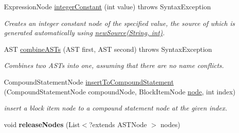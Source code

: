 \begin{DoxyCompactItemize}
Expression\+Node \hyperlink{classedu_1_1udel_1_1cis_1_1vsl_1_1civl_1_1transform_1_1common_1_1BaseWorker_a7319636f3dfa7b664614020a9644caed}{integer\+Constant} (int value)  throws Syntax\+Exception 
\begin{DoxyCompactList}\small\item\em Creates an integer constant node of the specified value, the source of which is generated automatically using \hyperlink{classedu_1_1udel_1_1cis_1_1vsl_1_1civl_1_1transform_1_1common_1_1BaseWorker_a45d64b7e09a96de3fe161198a0ad8f5a}{new\+Source(\+String, int)}. \end{DoxyCompactList}\item 
A\+S\+T \hyperlink{classedu_1_1udel_1_1cis_1_1vsl_1_1civl_1_1transform_1_1common_1_1BaseWorker_ababeeb0da2669691b3e64445cc33d348}{combine\+A\+S\+Ts} (A\+S\+T first, A\+S\+T second)  throws Syntax\+Exception 
\begin{DoxyCompactList}\small\item\em Combines two A\+S\+Ts into one, assuming that there are no name conflicts. \end{DoxyCompactList}\item 
Compound\+Statement\+Node \hyperlink{classedu_1_1udel_1_1cis_1_1vsl_1_1civl_1_1transform_1_1common_1_1BaseWorker_ae7e4963406c0589fc8219552b591a3a0}{insert\+To\+Compound\+Statement} (Compound\+Statement\+Node compound\+Node, Block\+Item\+Node \hyperlink{structnode}{node}, int index)
\begin{DoxyCompactList}\small\item\em insert a block item node to a compound statement node at the given index. \end{DoxyCompactList}\item 
\hypertarget{classedu_1_1udel_1_1cis_1_1vsl_1_1civl_1_1transform_1_1common_1_1BaseWorker_ad4a228f5e07d9d42e9356536743504a7}{}void {\bfseries release\+Nodes} (List$<$?extends A\+S\+T\+Node $>$ nodes)\label{classedu_1_1udel_1_1cis_1_1vsl_1_1civl_1_1transform_1_1common_1_1BaseWorker_ad4a228f5e07d9d42e9356536743504a7}

\end{DoxyCompactItemize}
